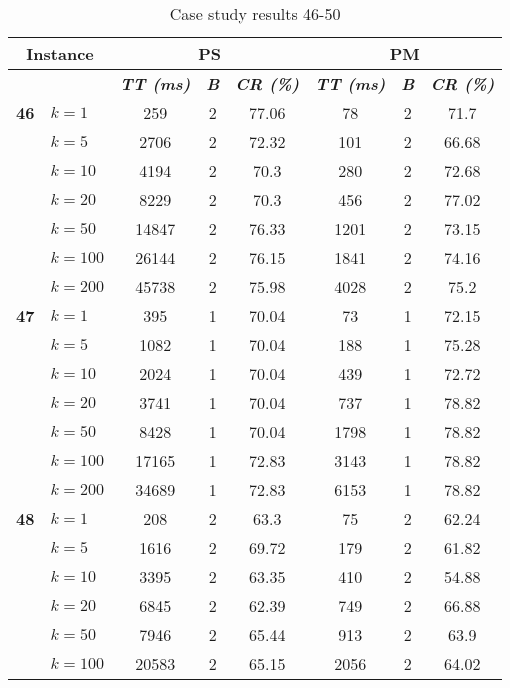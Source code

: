     \begin{table}[htbp]
    \caption{Case study results 46-50}
    \centering
    \begin{tabular}{|l|l|c|c|c|c|c|c|}
    \hline
    \multicolumn{ 2}{|c|}{\textbf{Instance}} & \multicolumn{ 3}{c|}{\textbf{PS}} & \multicolumn{ 3}{c|}{\textbf{PM}} \\ \hline
    \multicolumn{ 2}{|l|}{} & \textbf{\textit{TT (ms)}} & \textbf{\textit{B}} & \textbf{\textit{CR (\%)}} & \textbf{\textit{TT (ms)}} & \textbf{\textit{B}} & \textbf{\textit{CR (\%)}} \\ \hline
    \multicolumn{1}{|r|}{\textbf{46}} & $k=1$ & 259 & 2 & 77.06 & 78 & 2 & 71.7 \\ 
     & $k=5$ & 2706 & 2 & 72.32 & 101 & 2 & 66.68 \\ 
     & $k=10$ & 4194 & 2 & 70.3 & 280 & 2 & 72.68 \\ 
     & $k=20$ & 8229 & 2 & 70.3 & 456 & 2 & 77.02 \\ 
     & $k=50$ & 14847 & 2 & 76.33 & 1201 & 2 & 73.15 \\ 
     & $k=100$ & 26144 & 2 & 76.15 & 1841 & 2 & 74.16 \\ 
     & $k=200$ & 45738 & 2 & 75.98 & 4028 & 2 & 75.2 \\ \hline
    \multicolumn{1}{|r|}{\textbf{47}} & $k=1$ & 395 & 1 & 70.04 & 73 & 1 & 72.15 \\ 
     & $k=5$ & 1082 & 1 & 70.04 & 188 & 1 & 75.28 \\ 
     & $k=10$ & 2024 & 1 & 70.04 & 439 & 1 & 72.72 \\ 
     & $k=20$ & 3741 & 1 & 70.04 & 737 & 1 & 78.82 \\ 
     & $k=50$ & 8428 & 1 & 70.04 & 1798 & 1 & 78.82 \\ 
     & $k=100$ & 17165 & 1 & 72.83 & 3143 & 1 & 78.82 \\ 
     & $k=200$ & 34689 & 1 & 72.83 & 6153 & 1 & 78.82 \\ \hline
    \multicolumn{1}{|r|}{\textbf{48}} & $k=1$ & 208 & 2 & 63.3 & 75 & 2 & 62.24 \\ 
     & $k=5$ & 1616 & 2 & 69.72 & 179 & 2 & 61.82 \\ 
     & $k=10$ & 3395 & 2 & 63.35 & 410 & 2 & 54.88 \\ 
     & $k=20$ & 6845 & 2 & 62.39 & 749 & 2 & 66.88 \\ 
     & $k=50$ & 7946 & 2 & 65.44 & 913 & 2 & 63.9 \\ 
     & $k=100$ & 20583 & 2 & 65.15 & 2056 & 2 & 64.02 \\ 

\end{tabular}
\end{table}

